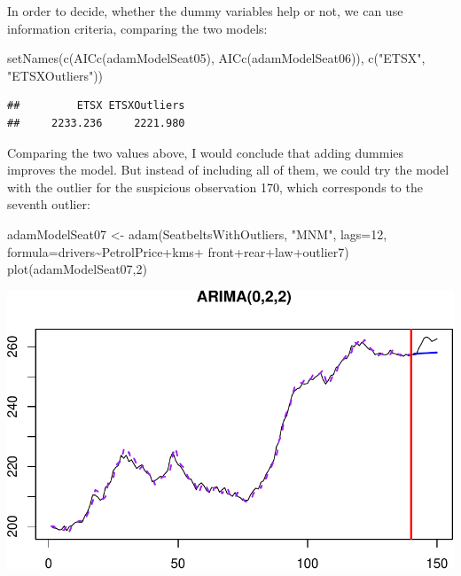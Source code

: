 \documentclass[
]{book}
\newenvironment{Shaded}{\begin{snugshade}}{\end{snugshade}}
\newcommand{\AttributeTok}[1]{\textcolor[rgb]{0.77,0.63,0.00}{#1}}
\newcommand{\DecValTok}[1]{\textcolor[rgb]{0.00,0.00,0.81}{#1}}
\newcommand{\FunctionTok}[1]{\textcolor[rgb]{0.00,0.00,0.00}{#1}}
\newcommand{\NormalTok}[1]{#1}
\newcommand{\OtherTok}[1]{\textcolor[rgb]{0.56,0.35,0.01}{#1}}
\newcommand{\SpecialCharTok}[1]{\textcolor[rgb]{0.00,0.00,0.00}{#1}}
\newcommand{\StringTok}[1]{\textcolor[rgb]{0.31,0.60,0.02}{#1}}
\theoremstyle{definition}
\theoremstyle{definition}
\theoremstyle{definition}
\theoremstyle{definition}
\theoremstyle{remark}
\begin{document}
In order to decide, whether the dummy variables help or not, we can use information criteria, comparing the two models:

\begin{Shaded}
\begin{Highlighting}[]
\FunctionTok{setNames}\NormalTok{(}\FunctionTok{c}\NormalTok{(}\FunctionTok{AICc}\NormalTok{(adamModelSeat05), }\FunctionTok{AICc}\NormalTok{(adamModelSeat06)),}
         \FunctionTok{c}\NormalTok{(}\StringTok{"ETSX"}\NormalTok{, }\StringTok{"ETSXOutliers"}\NormalTok{))}
\end{Highlighting}
\end{Shaded}

\begin{verbatim}
##         ETSX ETSXOutliers 
##     2233.236     2221.980
\end{verbatim}

Comparing the two values above, I would conclude that adding dummies improves the model. But instead of including all of them, we could try the model with the outlier for the suspicious observation 170, which corresponds to the seventh outlier:

\begin{Shaded}
\begin{Highlighting}[]
\NormalTok{adamModelSeat07 }\OtherTok{\textless{}{-}} \FunctionTok{adam}\NormalTok{(SeatbeltsWithOutliers, }\StringTok{"MNM"}\NormalTok{, }\AttributeTok{lags=}\DecValTok{12}\NormalTok{,}
                        \AttributeTok{formula=}\NormalTok{drivers}\SpecialCharTok{\textasciitilde{}}\NormalTok{PetrolPrice}\SpecialCharTok{+}\NormalTok{kms}\SpecialCharTok{+}
\NormalTok{                          front}\SpecialCharTok{+}\NormalTok{rear}\SpecialCharTok{+}\NormalTok{law}\SpecialCharTok{+}\NormalTok{outlier7)}
\FunctionTok{plot}\NormalTok{(adamModelSeat07,}\DecValTok{2}\NormalTok{)}
\end{Highlighting}
\end{Shaded}

\includegraphics{adam_files/figure-latex/unnamed-chunk-148-1.pdf}
\end{document}
